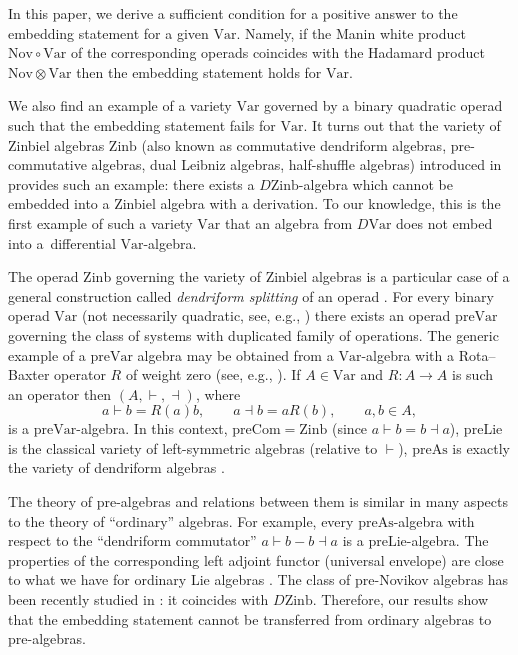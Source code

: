 \documentclass[pdftex]{sigma}
\numberwithin{equation}{section}
\def\Var{\mathrm{Var}}
\def\Nov{\mathrm{Nov}}
\def\Com{\mathrm{Com}}
\def\As{\mathrm{As}}
\def\Lie{\mathrm{Lie}}
\def\Zinb{\mathrm{Zinb}}
\def\pre{\mathrm{pre}}
\begin{document}
In this paper, we derive a sufficient condition for a positive
answer to the embedding statement for a given $\Var $.
Namely, if the Manin white product $\Nov\circ \Var$ of the corresponding operads coincides with the Hadamard product
$\Nov\otimes \Var $ then the embedding statement holds for $\Var$.

We also find an example of a variety $\Var $ governed by
a binary quadratic operad such that the embedding
statement fails for $\Var$. It turns out that
the variety of Zinbiel algebras $\Zinb $ (also known as commutative dendriform algebras, pre-commutative algebras, dual Leibniz algebras, half-shuffle algebras) introduced in \cite{Loday} provides such an example:
there exists a $D\Zinb $-algebra which cannot be embedded into a Zinbiel algebra with a derivation.
To our knowledge, this is the first example of such a variety $\Var$ that an algebra from $D\Var$ does not embed into a~differential $\Var$-algebra.

The operad $\Zinb $ governing the variety of Zinbiel algebras
is a particular case of a general construction called {\em dendriform splitting} of an operad \cite{BBGN}.
For every binary operad $\Var $ (not necessarily quadratic,
see, e.g., \cite{GubKol2014}) there exists an operad
$\pre\Var $ governing the class of systems with duplicated
family of operations. The generic example of a $\pre\Var$ algebra may be obtained from a $\Var$-algebra
with a Rota--Baxter operator $R$ of weight zero
(see, e.g., \cite{LiGuo_RBABook}).
If $A\in \Var$ and $R\colon A\to A$ is such an operator then
$(A,\vdash, \dashv)$, where
\[
a\vdash b = R(a)b,\qquad a\dashv b = aR(b), \qquad a,b\in A,
\]
is a $\pre\Var $-algebra.
In this context,
$\pre\Com =\Zinb$ (since $a\vdash b = b\dashv a$),
$\pre\Lie$ is the classical variety of left-symmetric algebras (relative to $\vdash $), $\pre\As$ is exactly the variety of dendriform algebras \cite{Loday}.

The theory of pre-algebras and relations between them is similar
in many aspects to the theory of ``ordinary'' algebras.
For example, every $\pre\As $-algebra with respect to the ``dendriform commutator'' $a\vdash b - b\dashv a$ is a $\pre\Lie$-algebra. The properties of the corresponding left adjoint functor (universal envelope) are close to what we have
for ordinary Lie algebras
\cite{DotsTamaroff, Gubarev}.
The class of pre-Novikov algebras has been recently studied in \cite{Hong2023}: it coincides with $D\Zinb $.
Therefore, our results show that the embedding statement
cannot be transferred from ordinary algebras to pre-algebras.
\end{document}
